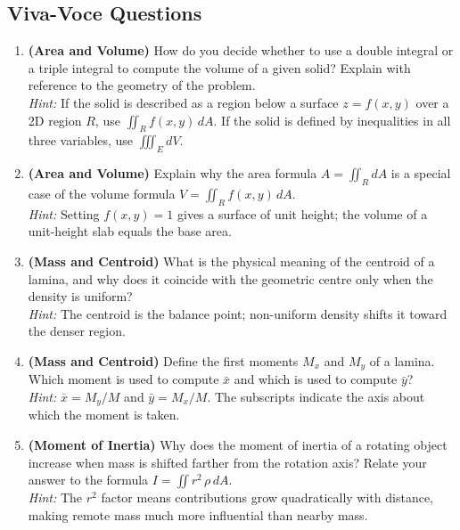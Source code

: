 \documentclass[12pt,a4paper]{article}
\begin{document}
\subsection*{Viva-Voce Questions}

\begin{enumerate}[label=\textbf{V\arabic*.}]

  \item \textbf{(Area and Volume)} How do you decide whether to use a double integral or a triple integral to compute the volume of a given solid? Explain with reference to the geometry of the problem. \\
  \textit{Hint:} If the solid is described as a region below a surface \(z = f(x,y)\) over a 2D region \(R\), use \(\iint_R f(x,y)\,dA\). If the solid is defined by inequalities in all three variables, use \(\iiint_E dV\).

  \item \textbf{(Area and Volume)} Explain why the area formula \(A = \iint_R dA\) is a special case of the volume formula \(V = \iint_R f(x,y)\,dA\). \\
  \textit{Hint:} Setting \(f(x,y) = 1\) gives a surface of unit height; the volume of a unit-height slab equals the base area.

  \item \textbf{(Mass and Centroid)} What is the physical meaning of the centroid of a lamina, and why does it coincide with the geometric centre only when the density is uniform? \\
  \textit{Hint:} The centroid is the balance point; non-uniform density shifts it toward the denser region.

  \item \textbf{(Mass and Centroid)} Define the first moments \(M_x\) and \(M_y\) of a lamina. Which moment is used to compute \(\bar{x}\) and which is used to compute \(\bar{y}\)? \\
  \textit{Hint:} \(\bar{x} = M_y/M\) and \(\bar{y} = M_x/M\). The subscripts indicate the axis about which the moment is taken.

  \item \textbf{(Moment of Inertia)} Why does the moment of inertia of a rotating object increase when mass is shifted farther from the rotation axis? Relate your answer to the formula \(I = \iint r^2\,\rho\,dA\). \\
  \textit{Hint:} The \(r^2\) factor means contributions grow quadratically with distance, making remote mass much more influential than nearby mass.


\end{enumerate}
\end{document}
